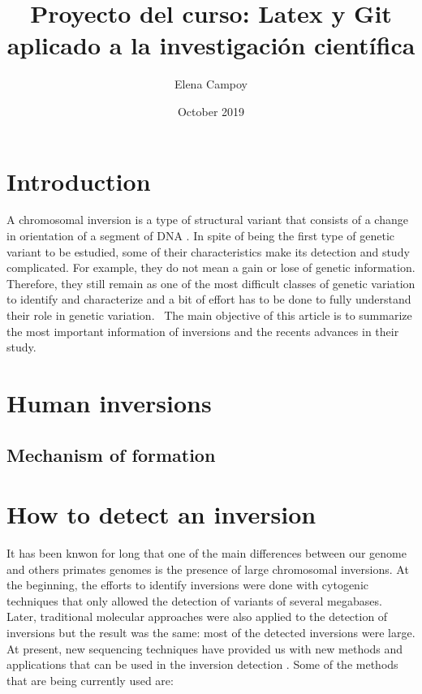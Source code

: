 \documentclass{article}
\title{Proyecto del curso: Latex y Git aplicado a la investigación científica}
\author{Elena Campoy}
\date{October 2019}
\begin{document}
\maketitle

\section{Introduction}
A chromosomal inversion is a type of structural variant that consists of a change in orientation of a segment of DNA \cite{puig_human_2015, giner-delgado_evolutionary_2019}. In spite of being the first type of genetic variant to be estudied, some of their characteristics make its detection and study complicated. For example, they do not mean a gain or lose of genetic information. Therefore, they still remain as one of the most difficult classes of genetic variation to identify and characterize \cite{puig_determining_2019} and a bit of effort has to be done to fully understand their role in genetic variation. 
\
The main objective of this article is to summarize the most important information of inversions and the recents advances in their study. 
\section{Human inversions}
\subsection{Mechanism of formation}

\section{How to detect an inversion}
It has been knwon for long that one of the main differences between our genome and others primates genomes is the presence of large chromosomal inversions. At the beginning, the efforts to identify inversions were done with cytogenic techniques that only allowed the detection of variants of several megabases. Later, traditional molecular approaches were also applied to the detection of inversions but the result was the same: most of the detected inversions were large. At present, new sequencing techniques have provided us with new methods and applications that can be used in the inversion detection \cite{puig_human_2015}. 
Some of the methods that are being currently used are:
\end{document}
